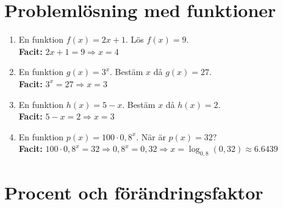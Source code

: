 \documentclass[a4paper,11pt]{article}
\begin{document}
\newpage
\section*{Problemlösning med funktioner}

\begin{enumerate}[label=\textbf{\arabic*.}]
    \item En funktion $f(x) = 2x + 1$. Lös $f(x) = 9$.
    \\ \textbf{Facit:} $2x+1=9 \Rightarrow x=4$
    \item En funktion $g(x) = 3^x$. Bestäm $x$ då $g(x) = 27$.
    \\ \textbf{Facit:} $3^x=27 \Rightarrow x=3$
    \item En funktion $h(x) = 5 - x$. Bestäm $x$ då $h(x) = 2$.
    \\ \textbf{Facit:} $5-x=2 \Rightarrow x=3$
    \item En funktion $p(x) = 100 \cdot 0,8^x$. När är $p(x) = 32$?
    \\ \textbf{Facit:} $100\cdot0,8^x=32 \Rightarrow 0,8^x=0,32 \Rightarrow x=\log_{0,8}(0,32) \approx 6.6439$
\end{enumerate}

\newpage
\section*{Procent och förändringsfaktor}
\end{document}
